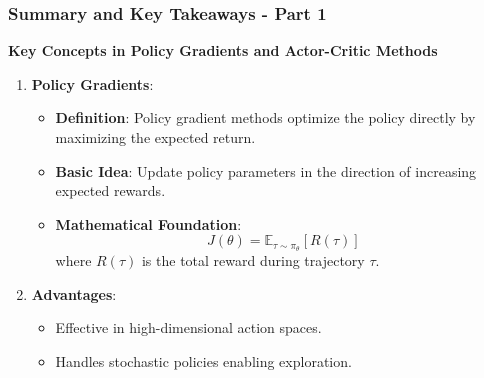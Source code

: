 \documentclass[aspectratio=169]{beamer}
\begin{document}
\begin{frame}[fragile]
    \frametitle{Summary and Key Takeaways - Part 1}
    \textbf{Key Concepts in Policy Gradients and Actor-Critic Methods}
    \begin{enumerate}
        \item \textbf{Policy Gradients}:
            \begin{itemize}
                \item \textbf{Definition}: Policy gradient methods optimize the policy directly by maximizing the expected return.
                \item \textbf{Basic Idea}: Update policy parameters in the direction of increasing expected rewards.
                \item \textbf{Mathematical Foundation}:
                    \begin{equation}
                    J(\theta) = \mathbb{E}_{\tau \sim \pi_\theta} \left[ R(\tau) \right]
                    \end{equation}
                    where \( R(\tau) \) is the total reward during trajectory \( \tau \).
            \end{itemize}
        
        \item \textbf{Advantages}:
            \begin{itemize}
                \item Effective in high-dimensional action spaces.
                \item Handles stochastic policies enabling exploration.
            \end{itemize}
    \end{enumerate}
\end{frame}
\end{document}
